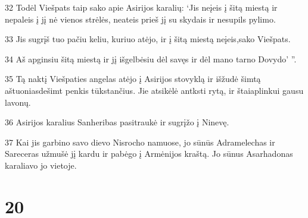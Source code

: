 \par 32 Todėl Viešpats taip sako apie Asirijos karalių: ‘Jis neįeis į šitą miestą ir nepaleis į jį nė vienos strėlės, neateis prieš jį su skydais ir nesupils pylimo. 
\par 33 Jis sugrįš tuo pačiu keliu, kuriuo atėjo, ir į šitą miestą neįeis,­sako Viešpats.­ 
\par 34 Aš apginsiu šitą miestą ir jį išgelbėsiu dėl savęs ir dėl mano tarno Dovydo’ ”. 
\par 35 Tą naktį Viešpaties angelas atėjo į Asirijos stovyklą ir išžudė šimtą aštuoniasdešimt penkis tūkstančius. Jie atsikėlė antksti rytą, ir štai­aplinkui gausu lavonų. 
\par 36 Asirijos karalius Sanheribas pasitraukė ir sugrįžo į Ninevę. 
\par 37 Kai jis garbino savo dievo Nisrocho namuose, jo sūnūs Adramelechas ir Sareceras užmušė jį kardu ir pabėgo į Armėnijos kraštą. Jo sūnus Asarhadonas karaliavo jo vietoje.



\chapter{20}

